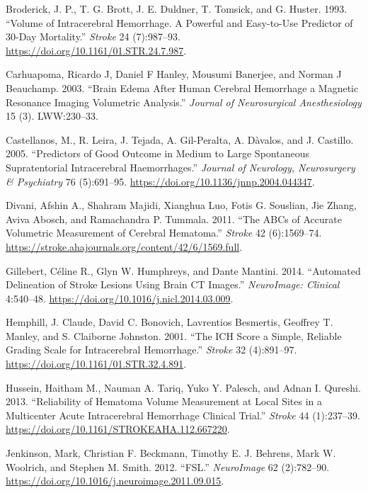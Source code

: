 \documentclass[]{elsarticle} %
\begin{document}
\leavevmode\hypertarget{ref-broderick_volume_1993}{}%
Broderick, J. P., T. G. Brott, J. E. Duldner, T. Tomsick, and G. Huster.
1993. ``Volume of Intracerebral Hemorrhage. A Powerful and Easy-to-Use
Predictor of 30-Day Mortality.'' \emph{Stroke} 24 (7):987--93.
\url{https://doi.org/10.1161/01.STR.24.7.987}.

\leavevmode\hypertarget{ref-carhuapoma2003brain}{}%
Carhuapoma, Ricardo J, Daniel F Hanley, Mousumi Banerjee, and Norman J
Beauchamp. 2003. ``Brain Edema After Human Cerebral Hemorrhage a
Magnetic Resonance Imaging Volumetric Analysis.'' \emph{Journal of
Neurosurgical Anesthesiology} 15 (3). LWW:230--33.

\leavevmode\hypertarget{ref-castellanos_predictors_2005}{}%
Castellanos, M., R. Leira, J. Tejada, A. Gil-Peralta, A. Dàvalos, and J.
Castillo. 2005. ``Predictors of Good Outcome in Medium to Large
Spontaneous Supratentorial Intracerebral Haemorrhages.'' \emph{Journal
of Neurology, Neurosurgery \& Psychiatry} 76 (5):691--95.
\url{https://doi.org/10.1136/jnnp.2004.044347}.

\leavevmode\hypertarget{ref-divani_abcs_2011}{}%
Divani, Afshin A., Shahram Majidi, Xianghua Luo, Fotis G. Souslian, Jie
Zhang, Aviva Abosch, and Ramachandra P. Tummala. 2011. ``The ABCs of
Accurate Volumetric Measurement of Cerebral Hematoma.'' \emph{Stroke} 42
(6):1569--74.
\url{https://stroke.ahajournals.org/content/42/6/1569.full}.

\leavevmode\hypertarget{ref-gillebert_automated_2014}{}%
Gillebert, Céline R., Glyn W. Humphreys, and Dante Mantini. 2014.
``Automated Delineation of Stroke Lesions Using Brain CT Images.''
\emph{NeuroImage: Clinical} 4:540--48.
\url{https://doi.org/10.1016/j.nicl.2014.03.009}.

\leavevmode\hypertarget{ref-hemphill_ich_2001}{}%
Hemphill, J. Claude, David C. Bonovich, Lavrentios Besmertis, Geoffrey
T. Manley, and S. Claiborne Johnston. 2001. ``The ICH Score a Simple,
Reliable Grading Scale for Intracerebral Hemorrhage.'' \emph{Stroke} 32
(4):891--97. \url{https://doi.org/10.1161/01.STR.32.4.891}.

\leavevmode\hypertarget{ref-hussein_reliability_2013}{}%
Hussein, Haitham M., Nauman A. Tariq, Yuko Y. Palesch, and Adnan I.
Qureshi. 2013. ``Reliability of Hematoma Volume Measurement at Local
Sites in a Multicenter Acute Intracerebral Hemorrhage Clinical Trial.''
\emph{Stroke} 44 (1):237--39.
\url{https://doi.org/10.1161/STROKEAHA.112.667220}.

\leavevmode\hypertarget{ref-jenkinson_fsl_2012}{}%
Jenkinson, Mark, Christian F. Beckmann, Timothy E. J. Behrens, Mark W.
Woolrich, and Stephen M. Smith. 2012. ``FSL.'' \emph{NeuroImage} 62
(2):782--90. \url{https://doi.org/10.1016/j.neuroimage.2011.09.015}.
\end{document}
